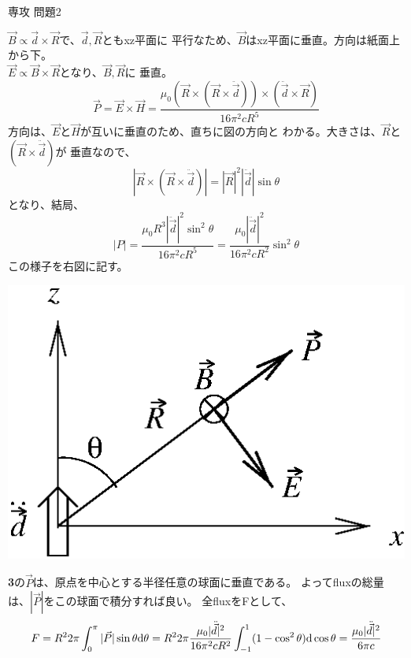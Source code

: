\documentclass[fleqn]{jbook}
\begin{document}
\begin{answer}{専攻 問題2}{}
\begin{subanswers}
\SubAnswer
\parbox[t]{95mm}{
  $\vec{B}\propto\vec{d}\times\vec{R}$で、$ \vec{d},\vec{R}$ともxz平面に
  平行なため、$\vec{B}$はxz平面に垂直。方向は紙面上から下。\\
  $\vec{E}\propto \vec{B}\times\vec{R}$となり、$\vec{B},\vec{R}$に
  垂直。
%
  \[ \vec{P}=\vec{E}\times\vec{H}%
     = \frac{\mu_0(\vec{R}\times(\vec{R}\times\ddot{\vec{d}}))\times
       (\ddot{\vec{d}}\times\vec{R})}{16\pi^2cR^5} \]
%
  方向は、$\vec{E}$と$\vec{H}$が互いに垂直のため、直ちに図の方向と
  わかる。大きさは、$\vec{R}$と$(\vec{R}\times\ddot{\vec{d}})$が
  垂直なので、
%
  \[ |\vec{R}\times(\vec{R}\times\ddot{\vec{d}})|%
     = |\vec{R}|^2|\ddot{\vec{d}}|\sin\theta \]
%
  となり、結局、
%
  \[ |P| = \frac{\mu_0R^3|\ddot{\vec{d}}|^2\sin^2\theta}{16\pi^2cR^5}
         = \frac{\mu_0|\ddot{\vec{d}}|^2}{16\pi^2cR^2}\sin^2\theta \]
%
  この様子を右図に記す。
%
}\parbox[t]{65mm}{
  \begin{center}
    \mbox{\includegraphics[clip]{1994phy2-3.eps}}
  \end{center}}


\SubAnswer
  {\bf 3}の$\vec{P}$は、原点を中心とする半径任意の球面に垂直である。
  よってfluxの総量は、$|\vec{P}|$をこの球面で積分すれば良い。
  全fluxをFとして、
%
  \[ F = R^2 2\pi \int_{0}^{\pi}|\vec{P}|\sin\theta \d{\theta}%
       = R^2 2\pi \frac{\mu_0|\ddot{\vec{d}}|^2}{16\pi^2cR^2}%
         \int_{-1}^{1}(1-\cos^2\theta)\d{\cos\theta}%
       = \frac{\mu_0|\ddot{\vec{d}}|^2}{6\pi c} \]

\end{subanswers}
\end{answer}
\end{document}
